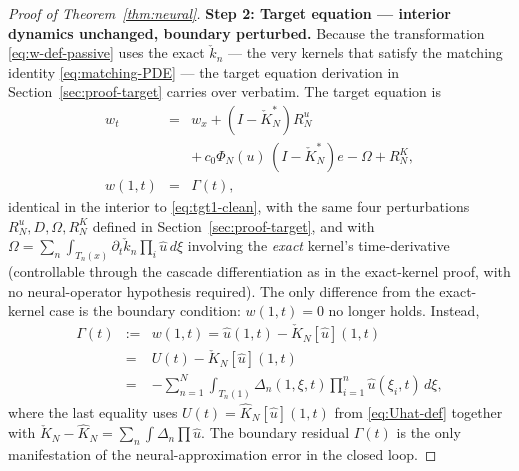 \documentclass[journal,twoside,web]{ieeecolor}
\begin{document}
\begin{proof}[Proof of Theorem~\ref{thm:neural}]
\medskip\noindent\textbf{Step 2: Target equation --- interior dynamics unchanged, boundary perturbed.}
Because the transformation \eqref{eq:w-def-passive} uses the exact $\check k_n$ --- the very kernels that satisfy the matching identity \eqref{eq:matching-PDE} --- the target equation derivation in Section~\ref{sec:proof-target} carries over verbatim. The target equation is
\begin{eqnarray}
w_t &=& w_x+(I-\check K_N^*)R^u_N \nonumber\\
&& +\,c_0\Phi_N(u)\,(I-\check K_N^*)e-\Omega+R^K_N, \label{eq:tgt1-neural}\\
w(1,t) &=& \Gamma(t), \label{eq:tgt2-neural}
\end{eqnarray}
identical in the interior to \eqref{eq:tgt1-clean}, with the same four perturbations $R^u_N,D,\Omega,R^K_N$ defined in Section~\ref{sec:proof-target}, and with $\Omega=\sum_n\int_{T_n(x)}\partial_t\check k_n\prod_i\hat u\,d\xi$ involving the \emph{exact} kernel's time-derivative (controllable through the cascade differentiation as in the exact-kernel proof, with no neural-operator hypothesis required). The only difference from the exact-kernel case is the boundary condition: $w(1,t)=0$ no longer holds. Instead,
\begin{eqnarray}
\Gamma(t) &:=& w(1,t)=\hat u(1,t)-\check K_N[\hat u](1,t) \nonumber\\
&=& U(t)-\check K_N[\hat u](1,t) \nonumber\\
&=& -\sum_{n=1}^N\int_{T_n(1)}\Delta_n(1,\xi,t)\prod_{i=1}^n\hat u(\xi_i,t)\,d\xi, \label{eq:Gamma-def}
\end{eqnarray}
where the last equality uses $U(t)=\hat K_N[\hat u](1,t)$ from \eqref{eq:Uhat-def} together with $\check K_N-\hat K_N=\sum_n\int\Delta_n\prod\hat u$. The boundary residual $\Gamma(t)$ is the only manifestation of the neural-approximation error in the closed loop.


\end{proof}
\end{document}

